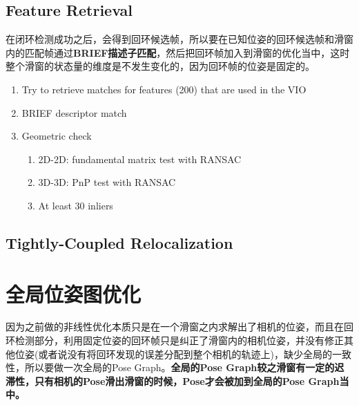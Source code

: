 \documentclass[12pt,a4paper]{article}
\begin{document}
\subsection{Feature Retrieval}

在闭环检测成功之后，会得到回环候选帧，所以要在已知位姿的回环候选帧和滑窗内的匹配帧通过\textbf{BRIEF描述子匹配}，然后把回环帧加入到滑窗的优化当中，这时整个滑窗的状态量的维度是不发生变化的，因为回环帧的位姿是固定的。

\begin{enumerate}
\item Try to retrieve matches for features (200) that are used in the VIO
\item BRIEF descriptor match
\item Geometric check
  \begin{enumerate}
  \item 2D-2D: fundamental matrix test with RANSAC
  \item 3D-3D: PnP test with RANSAC
  \item At least 30 inliers
  \end{enumerate}
\end{enumerate}

\subsection{Tightly-Coupled Relocalization}

\section{全局位姿图优化}

因为之前做的非线性优化本质只是在一个滑窗之内求解出了相机的位姿，而且在回环检测部分，利用固定位姿的回环帧只是纠正了滑窗内的相机位姿，并没有修正其他位姿(或者说没有将回环发现的误差分配到整个相机的轨迹上)，缺少全局的一致性，所以要做一次全局的Pose Graph。\textbf{全局的Pose Graph较之滑窗有一定的迟滞性，只有相机的Pose滑出滑窗的时候，Pose才会被加到全局的Pose Graph当中。}
\end{document}
